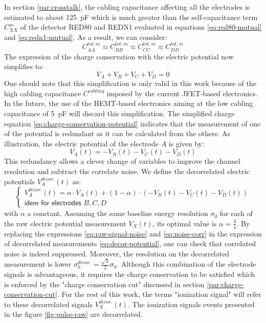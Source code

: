 In section \ref{par:crosstalk}, the cabling capacitance affecting all the electrodes is estimated to about \SI{125}{\pico\farad} which is much greater than the self-capacitance term $C_{XX}^m$ of the detector RED80 and REDN1 evaluated in equations \ref{eq:red80-mutual} and \ref{eq:redn1-mutual}. As a result, we can consider:
\begin{equation}
C_{AA}^{tot, m} \approx C_{BB}^{tot, m} \approx C_{CC}^{tot, m} \approx C_{DD}^{tot, m}
\end{equation}
The expression of the charge conservation with the electric potential now simplifies to:
\begin{equation}
\label{eq:charge-conservation-potential}
V_A + V_B + V_C + V_D = 0
\end{equation}
One should note that this simplification is only valid in this work because of the high cabling capacitance $C^{cabling}$ imposed by the current JFET-based electronics. In the future, the use of the HEMT-based electronics aiming at the low cabling capacitance of \SI{5}{\pico\farad} will discard this simplification.
The simplified charge equation \ref{eq:charge-conservation-potential} indicates that the measurement of one of the potential is redundant as it can be calculated from the others. As illustration, the electric potential of the electrode $A$ is given by:
\begin{equation}
V_A(t) = -V_B(t) - V_C(t) - V_D(t)
\end{equation}
This redundancy allows a clever change of variables to improve the channel resolution and subtract the correlate noise. We define the decorrelated electric potentials $V_A^{decor.}(t)$ as:
\begin{equation}
\label{eq:decor-potential}
\begin{cases}
V_A^{decor.}(t) = \alpha \cdot V_A(t) + (1-\alpha) \cdot ( -V_B(t) - V_C(t) - V_D(t)) \\
\textsf{idem for electrodes } B, C, D
\end{cases}
\end{equation}
with $\alpha$ a constant. Assuming the same baseline energy resolution $\sigma_0$ for each of the raw electric potential measurement $V_X(t)$, its optimal value is $\alpha=\frac{3}{4}$. By replacing the expressions \ref{eq:raw-signal-noise} and \ref{eq:noise-corr} in the expression of decorrelated measurements \ref{eq:decor-potential}, one can check that correlated noise is indeed suppressed. Moreover, the resolution on the decorrelated measurement is lower $\sigma_0^{decor.} = \frac{\sqrt{3}}{2} \sigma_0$. Although this combination of the electrode signals is advantageous, it requires the charge conservation to be satisfied which is enforced by the "charge conservation cut" discussed in section \ref{par:charge-conservation-cut}. For the rest of this work, the terms "ionization signal" will refer to these decorrelated signals $V_X^{decor.}(t)$. The ionization signals events presented in the figure \ref{fig:pulse-raw} are decorrelated.


